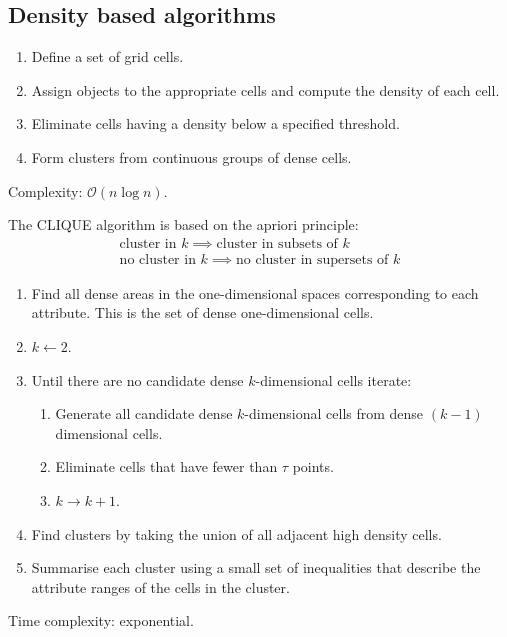 \documentclass[a4paper,9pt]{extarticle}
\begin{document}
\begin{multicols*}{2}
\subsection{Density based algorithms}
\begin{riquadro}
	\begin{enumerate}
		\item Define a set of grid cells.
		\item Assign objects to the appropriate cells and compute the density of each cell.
		\item Eliminate cells having a density below a specified threshold.
		\item Form clusters from continuous groups of dense cells.
	\end{enumerate}
\end{riquadro}
Complexity: $\mathcal{O}(n \log n)$.\par
The CLIQUE algorithm is based on the apriori principle: 
\begin{equation*}
	\begin{array}{c}
		\text{cluster in $k$}\implies\text{cluster in subsets of $k$}\\
		\text{no cluster in $k$}\implies\text{no cluster in supersets of $k$}
	\end{array}
\end{equation*}
\begin{riquadro}[CLIQUE]
	\begin{enumerate}
		\item Find all dense areas in the one-dimensional spaces corresponding to each attribute. This is the set of dense one-dimensional cells.
		\item $k\leftarrow2$.
		\item Until there are no candidate dense $k$-dimensional cells iterate:
		\begin{enumerate}
			\item Generate all candidate dense $k$-dimensional cells from dense $(k-1)$ dimensional cells.
			\item Eliminate cells that have fewer than $\tau$ points.
			\item $k\rightarrow k+1$.
		\end{enumerate}
		\item Find clusters by taking the union of all adjacent high density cells.
		\item Summarise each cluster using a small set of inequalities that describe the attribute ranges of the cells in the cluster.
	\end{enumerate}
\end{riquadro}
Time complexity: exponential.

\end{multicols*}
\end{document}
